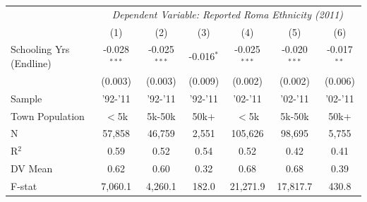 \begin{tabular}[t]{lcccccc}
\toprule
& \multicolumn{6}{c}{\textit{Dependent Variable: Reported Roma Ethnicity (2011)}}\\
& (1) & (2) & (3) & (4) & (5) & (6) \\
\midrule
Schooling Yrs (Endline) & -0.028$^{***}$ & -0.025$^{***}$ & -0.016$^{*}$ & -0.025$^{***}$ & -0.020$^{***}$ & -0.017$^{**}$ \\
& (0.003) & (0.003) & (0.009) & (0.002) & (0.002) & (0.006) \\
\midrule
Sample & '92-'11 & '92-'11 & '92-'11 & '02-'11 & '02-'11 & '02-'11 \\
Town Population & $<$5k & 5k-50k & 50k+ & $<$5k & 5k-50k & 50k+ \\
\midrule
N & 57,858 & 46,759 & 2,551 & 105,626 & 98,695 & 5,755 \\
R$^2$ & 0.59 & 0.52 & 0.54 & 0.52 & 0.42 & 0.41 \\
DV Mean & 0.62 & 0.60 & 0.32 & 0.68 & 0.68 & 0.39 \\
F-stat & 7,060.1 & 4,260.1 & 182.0 & 21,271.9 & 17,817.7 & 430.8 \\
\bottomrule
\end{tabular}
